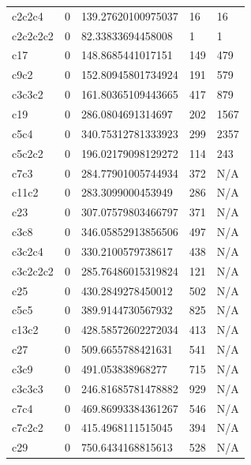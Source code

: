 \documentclass{article}
\begin{document}
\begin{table}[]
\begin{tabular}{@{}lllll@{}}
			c2c2c4   & 0     & 139.27620100975037 & 16 & 16             \\
			c2c2c2c2 & 0     & 82.33833694458008  & 1 & 1              \\
			c17      & 0     & 148.8685441017151  & 149 & 479            \\
			c9c2     & 0     & 152.80945801734924 & 191 & 579            \\
			c3c3c2   & 0     & 161.80365109443665 & 417 & 879           \\
			c19      & 0     & 286.0804691314697  & 202 & 1567            \\
			c5c4     & 0     & 340.75312781333923 & 299 & 2357            \\
			c5c2c2   & 0     & 196.02179098129272 & 114 & 243           \\
			c7c3     & 0     & 284.77901005744934 & 372 & N/A            \\
			c11c2    & 0     & 283.3099000453949  & 286 & N/A            \\
			c23      & 0     & 307.07579803466797 & 371 & N/A           \\
			c3c8     & 0     & 346.05852913856506 & 497 & N/A           \\
			c3c2c4   & 0     & 330.2100579738617  & 438 & N/A            \\
			c3c2c2c2 & 0     & 285.76486015319824 & 121 & N/A            \\
			c25      & 0     & 430.2849278450012  & 502 & N/A            \\
			c5c5     & 0     & 389.9144730567932  & 825 & N/A            \\
			c13c2    & 0     & 428.58572602272034 & 413 & N/A            \\
			c27      & 0     & 509.6655788421631  & 541 & N/A            \\
			c3c9     & 0     & 491.053838968277   & 715 & N/A            \\
			c3c3c3   & 0     & 246.81685781478882 & 929 & N/A            \\
			c7c4     & 0     & 469.86993384361267 & 546 & N/A            \\
			c7c2c2   & 0     & 415.4968111515045  & 394 & N/A            \\
			c29      & 0     & 750.6434168815613  & 528 & N/A            \\ \bottomrule
		\end{tabular}
	\end{table}
	
\end{document}
